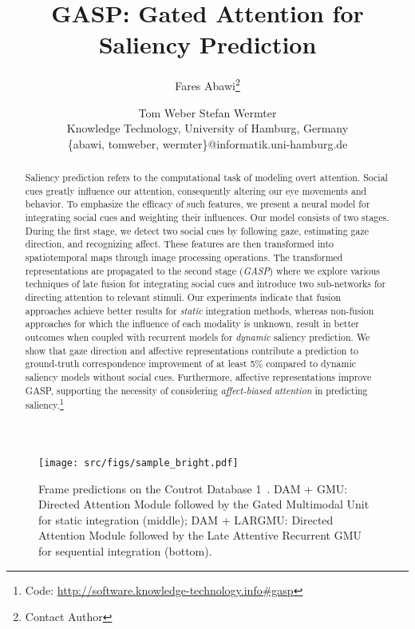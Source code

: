 \documentclass{article}
\title{GASP: Gated Attention for Saliency Prediction}
\author{
Fares Abawi\footnote{Contact Author}\and
Tom Weber\And
Stefan Wermter\\
\affiliations
Knowledge Technology, University of Hamburg, Germany\\
\emails
\{abawi, tomweber, wermter\}@informatik.uni-hamburg.de
}
\begin{document}
\maketitle

\begin{abstract}
Saliency prediction refers to the computational task of modeling overt attention. Social cues greatly influence our attention, consequently altering our eye movements and behavior. 
To emphasize the efficacy of such features, we present a neural model for integrating social cues and weighting their influences. Our model consists of two stages. During the first stage, we detect two social cues by following gaze, estimating gaze direction, and recognizing affect. These features are then transformed into spatiotemporal maps through image processing operations. The transformed representations are propagated to the second stage (\textit{GASP}) where we explore various techniques of late fusion for integrating social cues and introduce two sub-networks for directing attention to relevant stimuli. Our experiments indicate that fusion approaches achieve better results for \textit{static} integration methods, whereas non-fusion approaches for which the influence of each modality is unknown, result in better outcomes when coupled with recurrent models for \textit{dynamic} saliency prediction. We show that gaze direction and affective representations contribute a prediction to ground-truth correspondence improvement of at least 5\% compared to dynamic saliency models without social cues. Furthermore, affective representations improve GASP, supporting the necessity of considering \textit{affect-biased attention} in predicting saliency.\footnote{Code:  \url{http://software.knowledge-technology.info\#gasp}}
\end{abstract}









\begin{figure}[t!]
\centering
\texttt{[image: src/figs/sample\_bright.pdf]}
\caption{Frame predictions on the Coutrot Database 1~\protect\cite{coutrot2014audiovisual}. DAM + GMU: Directed Attention Module followed by the Gated Multimodal Unit for static integration (middle); DAM + LARGMU: Directed Attention Module followed by the Late Attentive Recurrent GMU for sequential integration (bottom).}
\label{fig:samples}
\end{figure}
\end{document}

